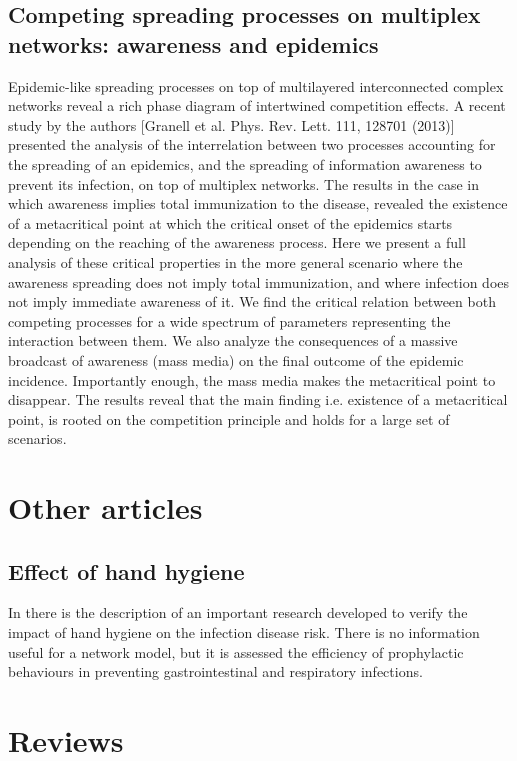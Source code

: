 \documentclass[a4paper,11pt]{scrartcl}
\begin{document}
	  \subsection{Competing spreading processes on multiplex networks: awareness and epidemics}
	  Epidemic-like spreading processes on top of multilayered interconnected complex networks reveal a rich phase diagram of intertwined competition effects. A recent study by the authors [Granell et al. Phys. Rev. Lett. 111, 128701 (2013)] presented the analysis of the interrelation between two processes accounting for
	  the spreading of an epidemics, and the spreading of information awareness to prevent its infection, on top of multiplex networks. The results in the case in which awareness implies total immunization to the disease, revealed the existence of a metacritical point at which the critical onset of the epidemics starts depending on the reaching of the awareness process. Here we present a full analysis of these critical properties in the more general scenario where the awareness spreading does not imply total immunization, and where infection does
	  not imply immediate awareness of it. We find the critical relation between both competing processes for a wide spectrum of parameters representing the interaction between them. We also analyze the consequences of a massive broadcast of awareness (mass media) on the final outcome of the epidemic incidence. Importantly enough, the mass media makes the metacritical point to disappear. The results reveal that the main finding i.e. existence of a metacritical point, is rooted on the competition principle and holds for a large set of scenarios.
	  	
	  	
\section{Other articles}
	
		\subsection{Effect of hand hygiene}
		In \cite{Aiello2008} there is the description of an important research developed to verify the impact of hand hygiene on the infection disease risk. There is no information useful for a network model, but it is assessed the efficiency of prophylactic behaviours in preventing gastrointestinal and respiratory infections. 
		
		
\section{Reviews}
\end{document}
